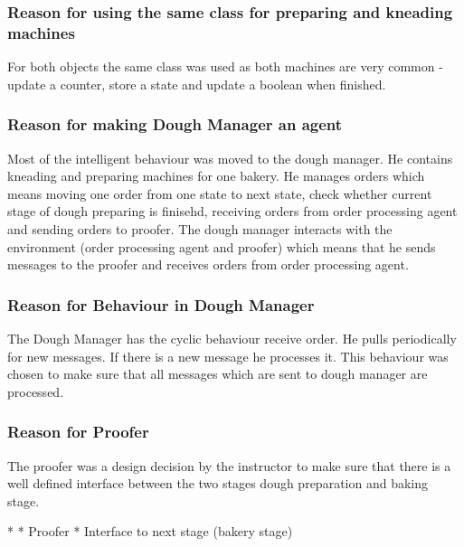 \documentclass[10pt,a4paper]{article}
\begin{document}
		\subsubsection{Reason for using the same class for preparing and kneading machines}
		For both objects the same class was used as both machines are very common - update a counter, store a state and update a boolean when finished.
		\subsubsection{Reason for making Dough Manager an agent}
		Most of the intelligent behaviour was moved to the dough manager. He contains kneading and preparing machines for one bakery. He manages orders which
		means moving one order from one state to next state, check whether current stage of dough preparing is finisehd, receiving orders from order processing agent
		and sending orders to proofer. The dough manager interacts with the environment (order processing agent and proofer) which means that he sends messages to the
		proofer and receives orders from order processing agent.
		\subsubsection{Reason for Behaviour in Dough Manager}
		The Dough Manager has the cyclic behaviour receive order. He pulls periodically for new messages. If there is a new message he processes it. This behaviour was chosen
		to make sure that all messages which are sent to dough manager are processed.
		\subsubsection{Reason for Proofer}
		The proofer was a design decision by the instructor to make sure that there is a well defined interface between the two stages dough preparation and baking stage.

	*
	* Proofer
	* Interface to next stage (bakery stage)
\end{document}
